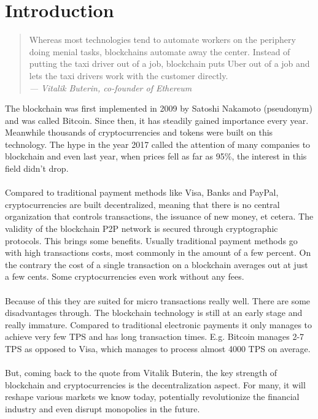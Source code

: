 \section{Introduction}
\begin{quote}
  Whereas most technologies tend to automate workers on the periphery doing menial tasks, blockchains automate away the center. Instead of putting the taxi driver out of a job, blockchain puts Uber out of a job and lets the taxi drivers work with the customer directly.
  \\
  {\textit{— Vitalik Buterin, co-founder of Ethereum}}
\end{quote}


The blockchain was first implemented in 2009 by Satoshi Nakamoto (pseudonym) and was called Bitcoin. Since then, it has steadily gained importance every year. Meanwhile thousands of cryptocurrencies and tokens were built on this technology. The hype in the year 2017 called the attention of many companies to blockchain and even last year, when prices fell as far as 95\%, the interest in this field didn’t drop.\\\\
Compared to traditional payment methods like Visa, Banks and PayPal, cryptocurrencies are built decentralized, meaning that there is no central organization that controls transactions, the issuance of new money, et cetera. The validity of the blockchain \gls{P2P} network is secured through cryptographic protocols. This brings some benefits. Usually traditional payment methods go with high transactions costs, most commonly in the amount of a few percent. On the contrary the cost of a single transaction on a blockchain averages out at just a few cents\cite{introTimestamp}. Some cryptocurrencies even work without any fees.\\\\
Because of this they are suited for micro transactions really well. There are some disadvantages through. The blockchain technology is still at an early stage and really immature. Compared to traditional electronic payments it only manages to achieve very few \gls{TPS} and has long transaction times. E.g. Bitcoin manages 2-7 TPS\cite{introTimestamp} as opposed to Visa, which manages to process almost 4000 TPS on average\cite{visa}.\\\\
But, coming back to the quote from Vitalik Buterin, the key strength of blockchain and cryptocurrencies is the decentralization aspect. For many, it will reshape various markets we know today, potentially revolutionize the financial industry and even disrupt monopolies in the future.\\\\
